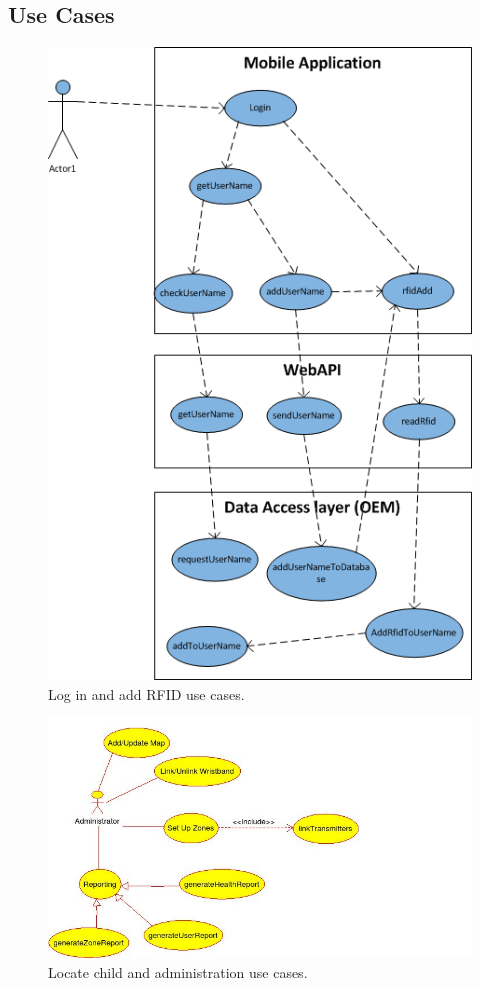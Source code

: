 \documentclass[11pt,titlepage]{article}
\begin{document}
\subsection{Use Cases}
\begin{figure}[H]
\includegraphics[scale=1.0]{UseCaseLogin.png}
\caption{Log in and add RFID use cases.}
\end{figure}
\begin{figure}[H]
\includegraphics[scale=0.9]{UseCase2.jpg}
\caption{Locate child and administration use cases.}
\end{figure}
\end{document}
